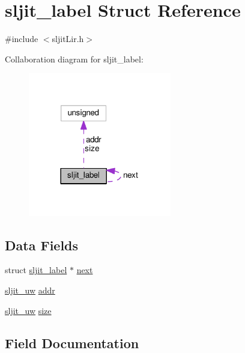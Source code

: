 \hypertarget{structsljit__label}{}\section{sljit\+\_\+label Struct Reference}
\label{structsljit__label}


{\ttfamily \#include $<$sljit\+Lir.\+h$>$}



Collaboration diagram for sljit\+\_\+label\+:
\nopagebreak
\begin{figure}[H]
\begin{center}
\leavevmode
\includegraphics[width=177pt]{structsljit__label__coll__graph}
\end{center}
\end{figure}
\subsection*{Data Fields}
\begin{DoxyCompactItemize}
\item 
struct \hyperlink{structsljit__label}{sljit\+\_\+label} $\ast$ \hyperlink{structsljit__label_a81dd53cfdcbbdd1fdd72b1acceff0a97}{next}
\item 
\hyperlink{sljitConfigInternal_8h_a4f2aa7461612a199a0e3fd93cd9a4d02}{sljit\+\_\+uw} \hyperlink{structsljit__label_ae3be800e1480f72427c3415eb9576367}{addr}
\item 
\hyperlink{sljitConfigInternal_8h_a4f2aa7461612a199a0e3fd93cd9a4d02}{sljit\+\_\+uw} \hyperlink{structsljit__label_ad654a12872ef3758a0435bb03cc5c4fa}{size}
\end{DoxyCompactItemize}


\subsection{Field Documentation}
